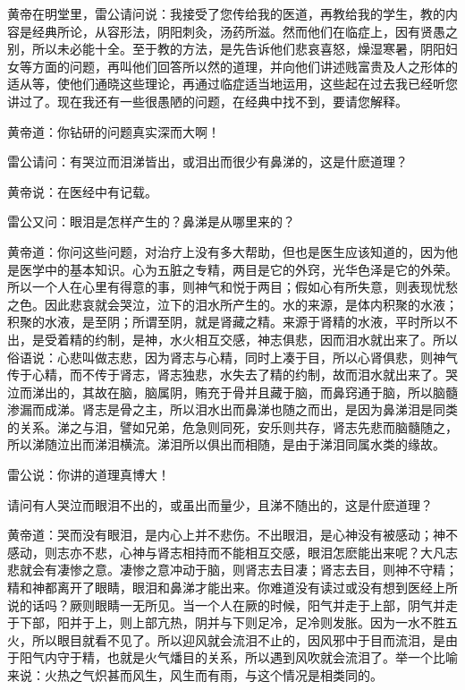 \documentclass[a4paper,12pt,UTF8,twoside]{ctexbook}
\begin{document}
黄帝在明堂里，雷公请问说：我接受了您传给我的医道，再教给我的学生，教的内容是经典所论，从容形法，阴阳刺灸，汤药所滋。然而他们在临症上，因有贤愚之别，所以未必能十全。至于教的方法，是先告诉他们悲哀喜怒，燥湿寒暑，阴阳妇女等方面的问题，再叫他们回答所以然的道理，并向他们讲述贱富贵及人之形体的适从等，使他们通晓这些理论，再通过临症适当地运用，这些起在过去我已经听您讲过了。现在我还有一些很愚陋的问题，在经典中找不到，要请您解释。

黄帝道：你钻研的问题真实深而大啊！

雷公请问：有哭泣而泪涕皆出，或泪出而很少有鼻涕的，这是什麽道理？

黄帝说：在医经中有记载。

雷公又问：眼泪是怎样产生的？鼻涕是从哪里来的？

黄帝道：你问这些问题，对治疗上没有多大帮助，但也是医生应该知道的，因为他是医学中的基本知识。心为五脏之专精，两目是它的外窍，光华色泽是它的外荣。所以一个人在心里有得意的事，则神气和悦于两目；假如心有所失意，则表现忧愁之色。因此悲哀就会哭泣，泣下的泪水所产生的。水的来源，是体内积聚的水液；积聚的水液，是至阴；所谓至阴，就是肾藏之精。来源于肾精的水液，平时所以不出，是受着精的约制，是神，水火相互交感，神志俱悲，因而泪水就出来了。所以俗语说：心悲叫做志悲，因为肾志与心精，同时上凑于目，所以心肾俱悲，则神气传于心精，而不传于肾志，肾志独悲，水失去了精的约制，故而泪水就出来了。哭泣而涕出的，其故在脑，脑属阴，贿充于骨并且藏于脑，而鼻窍通于脑，所以脑髓渗漏而成涕。肾志是骨之主，所以泪水出而鼻涕也随之而出，是因为鼻涕泪是同类的关系。涕之与泪，譬如兄弟，危急则同死，安乐则共存，肾志先悲而脑髓随之，所以涕随泣出而涕泪横流。涕泪所以俱出而相随，是由于涕泪同属水类的缘故。

雷公说：你讲的道理真博大！

请问有人哭泣而眼泪不出的，或虽出而量少，且涕不随出的，这是什麽道理？

黄帝道：哭而没有眼泪，是内心上并不悲伤。不出眼泪，是心神没有被感动；神不感动，则志亦不悲，心神与肾志相持而不能相互交感，眼泪怎麽能出来呢？大凡志悲就会有凄惨之意。凄惨之意冲动于脑，则肾志去目凄；肾志去目，则神不守精；精和神都离开了眼睛，眼泪和鼻涕才能出来。你难道没有读过或没有想到医经上所说的话吗？厥则眼睛一无所见。当一个人在厥的时候，阳气并走于上部，阴气并走于下部，阳并于上，则上部亢热，阴并与下则足冷，足冷则发胀。因为一水不胜五火，所以眼目就看不见了。所以迎风就会流泪不止的，因风邪中于目而流泪，是由于阳气内守于精，也就是火气燔目的关系，所以遇到风吹就会流泪了。举一个比喻来说：火热之气炽甚而风生，风生而有雨，与这个情况是相类同的。
\end{document}
